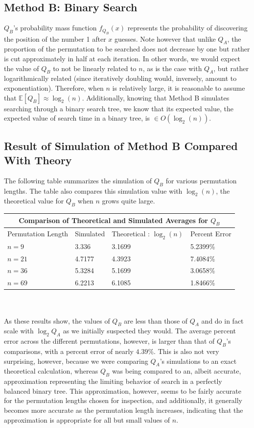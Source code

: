 \documentclass[11pt, oneside]{article}   	%
\begin{document}
\subsection{Method B: Binary Search}
$Q_B$'s probability mass function $f_{Q_B}(x)$ represents the probability of discovering the position of the number 1 after $x$ guesses. Note however that unlike $Q_A$, the proportion of the permutation to be searched does not decrease by one but rather is cut approximately in half at each iteration. In other words, we would expect the value of $Q_B$ to not be linearly related to $n$, as is the case with $Q_A$, but rather logarithmically related (since iteratively doubling would, inversely, amount to exponentiation). Therefore, when $n$ is relatively large, it is reasonable to assume that $\mathbb{E}[Q_B]\approx \log_2(n)$. Additionally, knowing that Method B simulates searching through a binary search tree, we know that its expected value, the expected value of search time in a binary tree, is $\in O(\log_2(n))$. 
\subsection{Result of Simulation of Method B Compared With Theory}
The following table summarizes the simulation of $Q_B$ for various permutation lengths. The table also compares this simulation value with $\log_2(n)$, the theoretical value for $Q_B$ when $n$ grows quite large.\\

\begin{tabular}{| m{3.5cm} || m{3.5cm} | m{3.5cm} | m{3.5cm} |}
\hline
\multicolumn{4}{|c|}{Comparison of Theoretical and Simulated Averages for $Q_B$}\\
\hline\hline
Permutation Length & Simulated & Theoretical : $\log_2(n)$ & Percent Error \\
\hline
$n=9$  & 3.336  & 3.1699 & 5.2399\% \\
$n=21$ & 4.7177 & 4.3923 & 7.4084\% \\
$n=36$ & 5.3284 & 5.1699 & 3.0658\% \\
$n=69$ & 6.2213 & 6.1085 & 1.8466\% \\
\hline
\end{tabular}\\ \\
As these results show, the values of $Q_B$ are less than those of $Q_A$ and do in fact scale with $\log_2{Q_A}$ as we initially suspected they would. The average percent error across the different permutations, however, is larger than that of $Q_B$'s comparisons, with a percent error of nearly $4.39\%$. This is also not very surprising, however, because we were comparing $Q_A$'s simulations to an exact theoretical calculation, whereas $Q_B$ was being compared to an, albeit accurate, approximation representing the limiting behavior of search in a perfectly balanced binary tree. This approximation, however, seems to be fairly accurate for the permutation lengths chosen for inspection, and additionally, it generally becomes more accurate as the permutation length increases, indicating that the approximation is appropriate for all but small values of $n$.
\end{document}
